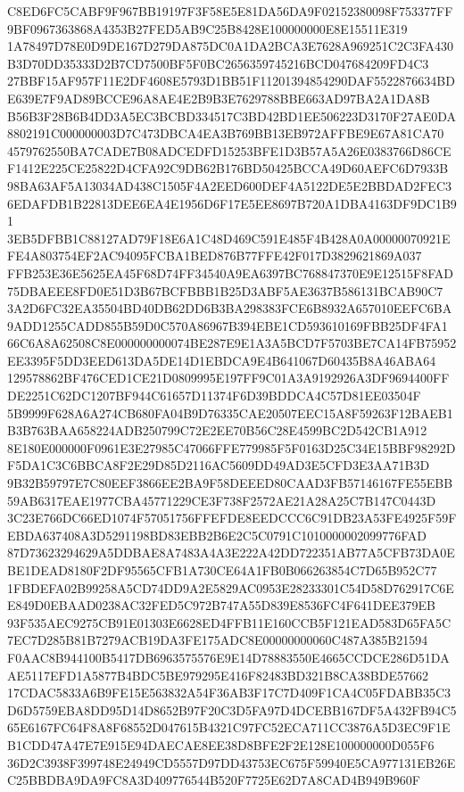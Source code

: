 \documentclass[UTF8,fontset=fandol,zihao=-4,a4paper]{ctexart}
\begin{document}
{{C8ED6FC5CABF9F967BB19197F3F58E5E81DA56DA9F02152380098F753377FF9BF0967363868A4353B27FED5AB9C25B8428E100000000E8E15511E319
1A78497D78E0D9DE167D279DA875DC0A1DA2BCA3E7628A969251C2C3FA430B3D70DD35333D2B7CD7500BF5F0BC2656359745216BCD047684209FD4C3
27BBF15AF957F11E2DF4608E5793D1BB51F11201394854290DAF5522876634BDE639E7F9AD89BCCE96A8AE4E2B9B3E7629788BBE663AD97BA2A1DA8B
B56B3F28B6B4DD3A5EC3BCBD334517C3BD42BD1EE506223D3170F27AE0DA8802191C000000003D7C473DBCA4EA3B769BB13EB972AFFBE9E67A81CA70
4579762550BA7CADE7B08ADCEDFD15253BFE1D3B57A5A26E0383766D86CEF1412E225CE25822D4CFA92C9DB62B176BD50425BCCA49D60AEFC6D7933B
98BA63AF5A13034AD438C1505F4A2EED600DEF4A5122DE5E2BBDAD2FEC36EDAFDB1B22813DEE6EA4E1956D6F17E5EE8697B720A1DBA4163DF9DC1B91
3EB5DFBB1C88127AD79F18E6A1C48D469C591E485F4B428A0A00000070921EFE4A803754EF2AC94095FCBA1BED876B77FFE42F017D3829621869A037
FFB253E36E5625EA45F68D74FF34540A9EA6397BC768847370E9E12515F8FAD75DBAEEE8FD0E51D3B67BCFBBB1B25D3ABF5AE3637B586131BCAB90C7
3A2D6FC32EA35504BD40DB62DD6B3BA298383FCE6B8932A657010EEFC6BA9ADD1255CADD855B59D0C570A86967B394EBE1CD593610169FBB25DF4FA1
66C6A8A62508C8E000000000074BE287E9E1A3A5BCD7F5703BE7CA14FB75952EE3395F5DD3EED613DA5DE14D1EBDCA9E4B641067D60435B8A46ABA64
129578862BF476CED1CE21D0809995E197FF9C01A3A9192926A3DF9694400FFDE2251C62DC1207BF944C61657D11374F6D39BDDCA4C57D81EE03504F
5B9999F628A6A274CB680FA04B9D76335CAE20507EEC15A8F59263F12BAEB1B3B763BAA658224ADB250799C72E2EE70B56C28E4599BC2D542CB1A912
8E180E000000F0961E3E27985C47066FFE779985F5F0163D25C34E15BBF98292DF5DA1C3C6BBCA8F2E29D85D2116AC5609DD49AD3E5CFD3E3AA71B3D
9B32B59797E7C80EEF3866EE2BA9F58DEEED80CAAD3FB57146167FE55EBB59AB6317EAE1977CBA45771229CE3F738F2572AE21A28A25C7B147C0443D
3C23E766DC66ED1074F57051756FFEFDE8EEDCCC6C91DB23A53FE4925F59FEBDA637408A3D5291198BD83EBB2B6E2C5C0791C1010000002099776FAD
87D73623294629A5DDBAE8A7483A4A3E222A42DD722351AB77A5CFB73DA0EBE1DEAD8180F2DF95565CFB1A730CE64A1FB0B066263854C7D65B952C77
1FBDEFA02B99258A5CD74DD9A2E5829AC0953E28233301C54D58D762917C6EE849D0EBAAD0238AC32FED5C972B747A55D839E8536FC4F641DEE379EB
93F535AEC9275CB91E01303E6628ED4FFB11E160CCB5F121EAD583D65FA5C7EC7D285B81B7279ACB19DA3FE175ADC8E00000000060C487A385B21594
F0AAC8B944100B5417DB6963575576E9E14D78883550E4665CCDCE286D51DAAE5117EFD1A5877B4BDC5BE979295E416F82483BD321B8CA38BDE57662
17CDAC5833A6B9FE15E563832A54F36AB3F17C7D409F1CA4C05FDABB35C3D6D5759EBA8DD95D14D8652B97F20C3D5FA97D4DCEBB167DF5A432FB94C5
65E6167FC64F8A8F68552D047615B4321C97FC52ECA711CC3876A5D3EC9F1EB1CDD47A47E7E915E94DAECAE8EE38D8BFE2F2E128E100000000D055F6
36D2C3938F399748E24949CD5557D97DD43753EC675F59940E5CA977131EB26EC25BBDBA9DA9FC8A3D409776544B520F7725E62D7A8CAD4B949B960F
}}
\end{document}
